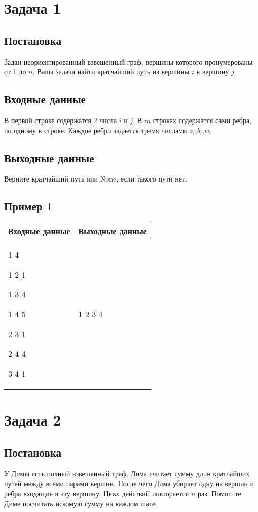 \documentclass[a4]{article}
\begin{document}
\section*{Задача 1}
\label{sec:orgb62fe60}
\subsection*{Постановка}
\label{sec:org37954e9}
Задан неориентированный взвешенный граф, вершины которого пронумерованы от 1 до $n$. Ваша задача найти кратчайший путь из вершины $i$ в вершину $j$.
\subsection*{Входные данные}
\label{sec:orgc51833b}
В первой строке содержатся 2 числа $i$ и  $j$.
В $m$ строках содержатся сами ребра, по одному в строке. Каждое ребро задается тремя числами $a_i$,$b_i$,$w_i$ 
\subsection*{Выходные данные}
\label{sec:org91cd1c2}
Верните кратчайший путь или None, если такого пути нет.
\subsection*{Пример 1}
\label{sec:org1b720b0}

\begin{table}[H]
\begin{center}
\begin{tabular}{|m{4cm}|m{4cm}|}
\hline
Входные данные & Выходные данные \\ \hline
1 4

1 2 1

1 3 4

 1 4 5

 2 3 1

 2 4 4

 3 4 1
&
1 2 3 4
\\ \hline
\end{tabular}
\end{center}
\end{table}


\pagebreak
\section*{Задача 2}
\label{sec:orgef181bd}
\subsection*{Постановка}
\label{sec:orgad8a20e}
У Димы есть полный взвешенный граф. Дима считает сумму длин кратчайших путей между всеми парами вершин. После чего Дима убирает одну из вершин и ребра входящие в эту вершину. Цикл действий повторяется $n$ раз. Помогите Диме посчитать искомую сумму на каждом шаге.
\end{document}
